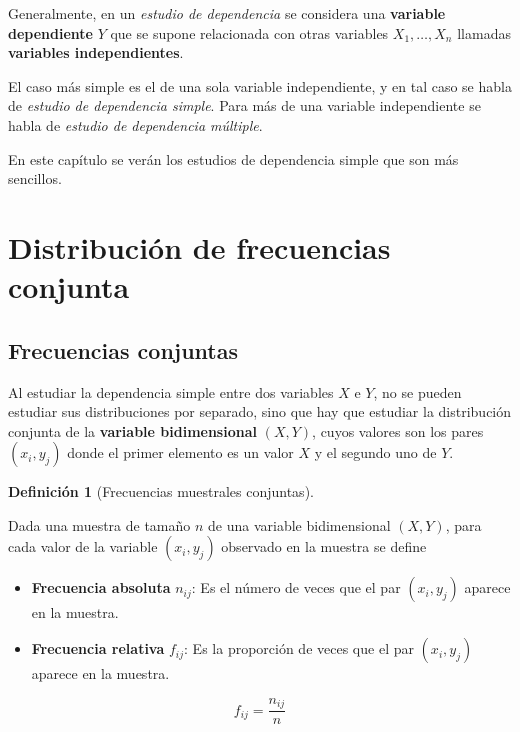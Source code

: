 \documentclass[
  a4paper,
]{scrreport}
\providecommand{\tightlist}{%
  \setlength{\itemsep}{0pt}\setlength{\parskip}{0pt}}\usepackage{longtable,booktabs,array}
\theoremstyle{plain}
\theoremstyle{definition}
\theoremstyle{definition}
\newtheorem{definition}{Definición}[chapter]
\theoremstyle{remark}
\begin{document}
Generalmente, en un \emph{estudio de dependencia} se considera una
\textbf{variable dependiente} \(Y\) que se supone relacionada con otras
variables \(X_1,\ldots,X_n\) llamadas \textbf{variables independientes}.

El caso más simple es el de una sola variable independiente, y en tal
caso se habla de \emph{estudio de dependencia simple}. Para más de una
variable independiente se habla de \emph{estudio de dependencia
múltiple}.

En este capítulo se verán los estudios de dependencia simple que son más
sencillos.

\section{Distribución de frecuencias
conjunta}\label{distribuciuxf3n-de-frecuencias-conjunta}

\subsection{Frecuencias conjuntas}\label{frecuencias-conjuntas}

Al estudiar la dependencia simple entre dos variables \(X\) e \(Y\), no
se pueden estudiar sus distribuciones por separado, sino que hay que
estudiar la distribución conjunta de la \textbf{variable bidimensional}
\((X,Y)\), cuyos valores son los pares \((x_i,y_j)\) donde el primer
elemento es un valor \(X\) y el segundo uno de \(Y\).

\begin{definition}[Frecuencias muestrales
conjuntas]\protect\hypertarget{def-frecuencias-muestrales-conjuntas}{}\label{def-frecuencias-muestrales-conjuntas}

Dada una muestra de tamaño \(n\) de una variable bidimensional
\((X,Y)\), para cada valor de la variable \((x_i,y_j)\) observado en la
muestra se define

\begin{itemize}
\tightlist
\item
  \textbf{Frecuencia absoluta} \(n_{ij}\): Es el número de veces que el
  par \((x_i,y_j)\) aparece en la muestra.
\item
  \textbf{Frecuencia relativa} \(f_{ij}\): Es la proporción de veces que
  el par \((x_i,y_j)\) aparece en la muestra.
\end{itemize}

\[f_{ij}=\frac{n_{ij}}{n}\]

\end{definition}
\end{document}
